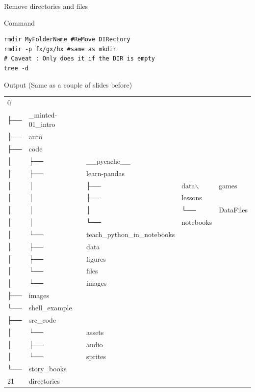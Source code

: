 \documentclass[presentation]{beamer}
\begin{document}
\begin{frame}[label={sec:org6cc59b5},fragile]{Remove directories and files}
 \begin{block}{Command}
\begin{verbatim}
rmdir MyFolderName #ReMove DIRectory
rmdir -p fx/gx/hx #same as mkdir
# Caveat : Only does it if the DIR is empty
tree -d
\end{verbatim}
\end{block}

\alert{Output} (Same as a couple of slides before)
\tiny
\begin{center}
\begin{tabular}{lllll}
\toprule
0 &  &  &  & \\
├── & \_minted-01\_intro &  &  & \\
├── & auto &  &  & \\
├── & code &  &  & \\
│   & ├── & \_\_pycache\_\_ &  & \\
│   & ├── & learn-pandas &  & \\
│   & │   & ├── & data$\backslash$ & games\\
│   & │   & ├── & lessons & \\
│   & │   & │   & └── & DataFiles\\
│   & │   & └── & notebooks & \\
│   & └── & teach\_python\_in\_notebooks &  & \\
│   & ├── & data &  & \\
│   & ├── & figures &  & \\
│   & └── & files &  & \\
│   & └── & images &  & \\
├── & images &  &  & \\
└── & shell\_example &  &  & \\
├── & src\_code &  &  & \\
│   & └── & assets &  & \\
│   & ├── & audio &  & \\
│   & └── & sprites &  & \\
└── & story\_books &  &  & \\
21 & directories &  &  & \\
\bottomrule
\end{tabular}
\end{center}
\end{frame}
\end{document}
